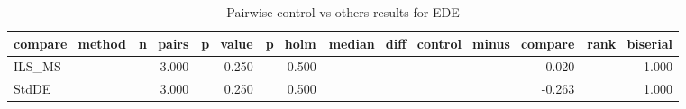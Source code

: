 \begin{table}[!t]
\centering
\caption{Pairwise control-vs-others results for EDE}
\label{tab:posthoc_holm_generated}
\begin{tabular}{lrrrrr}
\toprule
compare_method & n_pairs & p_value & p_holm & median_diff_control_minus_compare & rank_biserial \\
\midrule
ILS_MS & 3.000 & 0.250 & 0.500 & 0.020 & -1.000 \\
StdDE & 3.000 & 0.250 & 0.500 & -0.263 & 1.000 \\
\bottomrule
\end{tabular}

\end{table}